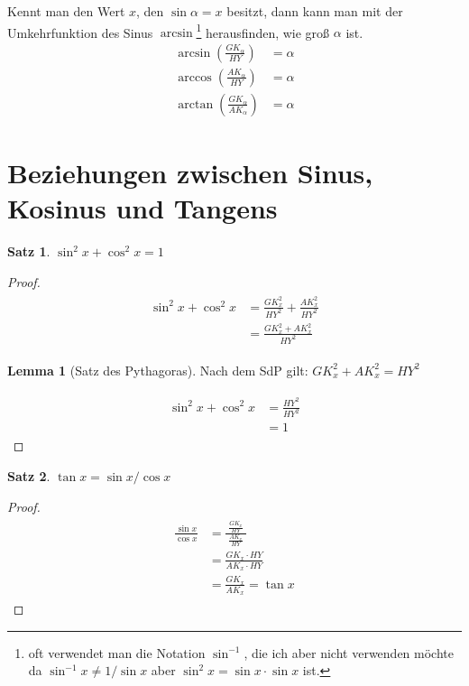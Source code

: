 \documentclass{report}
\newtheorem {satz}{Satz}
\newcommand{\x}{\cdot}
\theoremstyle{definition}
\theoremstyle{definition}
\theoremstyle{an}
\theoremstyle{lem}
\newtheorem{lemma}{Lemma}[section]
\theoremstyle{def}
\theoremstyle{def}
\begin{document}
Kennt man den Wert $x$, den $\sin \alpha = x$ besitzt, dann kann man mit der Umkehrfunktion des Sinus $\arcsin$\footnote{oft verwendet man die Notation $\sin^{-1}$, die ich aber nicht verwenden möchte da $\sin^{-1}x \neq 1/\sin x$ aber $\sin^2x = \sin x \x \sin x $ ist.} herausfinden, wie groß $\alpha$ ist.
\begin{align}
    \arcsin\left( \frac{GK_\alpha}{HY} \right) &= \alpha \\
    \arccos\left( \frac{AK_\alpha}{HY} \right) &= \alpha\\
    \arctan\left( \frac{GK_\alpha}{AK_\alpha} \right) &= \alpha
\end{align}

\section{Beziehungen zwischen Sinus, Kosinus und Tangens}
\begin{satz}
$\sin^2x+\cos^2x=1$
\end{satz}
\begin{proof}
\begin{align}
    \begin{aligned}
    \sin^2x+\cos^2x &= \frac{GK_x^2}{HY^2}+\frac{AK_x^2}{HY^2} \\ 
    &= \frac{GK_x^2+AK_x^2}{HY^2}
    \end{aligned}
\end{align}

\begin{lemma}[Satz des Pythagoras]
    Nach dem SdP gilt: $GK_x^2+AK_x^2 = HY^2$
\end{lemma}
\begin{align}
    \begin{aligned}
    \sin^2x+\cos^2x &= \frac{HY^2}{HY^2}\\
    &= 1
    \end{aligned}
\end{align}
\end{proof}

\begin{satz}
$\tan x = \sin x / \cos x$
\end{satz}

\begin{proof}
\begin{align}
    \begin{aligned}
    \frac{\sin x}{\cos x} &= \frac{\;\frac{GK_x}{HY}\;}{\frac{AK_x}{HY}} \\ &= \frac{GK_x \x HY}{AK_x \x HY}
    \\ &= \frac{GK_x}{AK_x}=\tan x
    \end{aligned}
\end{align}
\end{proof}
\end{document}
